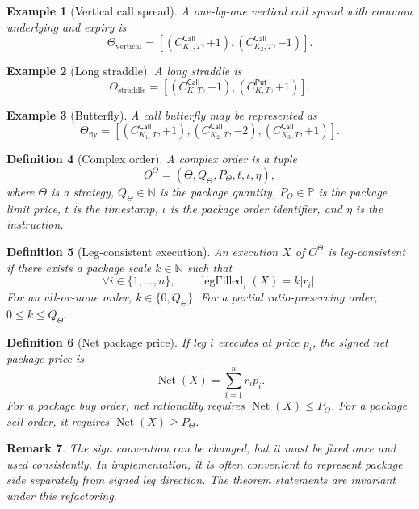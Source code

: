 \documentclass[11pt]{article}
\newtheorem{definition}{Definition}[section]
\newtheorem{remark}[definition]{Remark}
\newtheorem{example}[definition]{Example}
\newcommand{\Call}{\mathsf{Call}}
\newcommand{\Put}{\mathsf{Put}}
\newcommand{\Price}{\mathbb P}
\newcommand{\legfilled}{\operatorname{legFilled}}
\newcommand{\net}{\operatorname{Net}}
\begin{document}
\begin{example}[Vertical call spread]
A one-by-one vertical call spread with common underlying and expiry is
\[
\Theta_{\mathrm{vertical}}
= [(C^{\Call}_{K_1,T},+1),(C^{\Call}_{K_2,T},-1)].
\]
\end{example}

\begin{example}[Long straddle]
A long straddle is
\[
\Theta_{\mathrm{straddle}}
= [(C^{\Call}_{K,T},+1),(C^{\Put}_{K,T},+1)].
\]
\end{example}

\begin{example}[Butterfly]
A call butterfly may be represented as
\[
\Theta_{\mathrm{fly}}
= [(C^{\Call}_{K_1,T},+1),(C^{\Call}_{K_2,T},-2),(C^{\Call}_{K_3,T},+1)].
\]
\end{example}

\begin{definition}[Complex order]
A complex order is a tuple
\[
O^\Theta=(\Theta,Q_\Theta,P_\Theta,t,\iota,\eta),
\]
where \(\Theta\) is a strategy, \(Q_\Theta\in\mathbb N\) is the package quantity, \(P_\Theta\in\Price\) is the package limit price, \(t\) is the timestamp, \(\iota\) is the package order identifier, and \(\eta\) is the instruction.
\end{definition}

\begin{definition}[Leg-consistent execution]
An execution \(X\) of \(O^\Theta\) is leg-consistent if there exists a package scale \(k\in\mathbb N\) such that
\[
\forall i\in\{1,\ldots,n\},
\qquad
\legfilled_i(X)=k|r_i|.
\]
For an all-or-none order, \(k\in\{0,Q_\Theta\}\). For a partial ratio-preserving order, \(0\le k\le Q_\Theta\).
\end{definition}

\begin{definition}[Net package price]
If leg \(i\) executes at price \(p_i\), the signed net package price is
\[
\net(X)=\sum_{i=1}^n r_i p_i.
\]
For a package buy order, net rationality requires \(\net(X)\le P_\Theta\). For a package sell order, it requires \(\net(X)\ge P_\Theta\).
\end{definition}

\begin{remark}
The sign convention can be changed, but it must be fixed once and used consistently. In implementation, it is often convenient to represent package side separately from signed leg direction. The theorem statements are invariant under this refactoring.
\end{remark}
\end{document}

